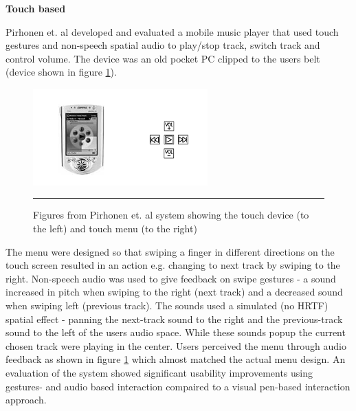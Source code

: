 \textbf{Touch based}

Pirhonen et. al \cite{pirhonen_gestural_2002} developed and evaluated a mobile music player that used touch gestures and non-speech spatial audio to play/stop track, switch track and control volume. The device was an old pocket PC clipped to the users belt (device shown in figure \ref{fig:pirhonen}).

\begin{figure}[t]
	\centering
		\includegraphics[width=0.6\textwidth,height=\textheight,keepaspectratio]{./Figures/pirhonen-system.png}
		\rule{35em}{0.5pt}
	\caption[Pirhonen system]{Figures from Pirhonen et. al \cite{pirhonen_gestural_2002} system showing the touch device (to the left) and touch menu (to the right)}
	\label{fig:pirhonen}
\end{figure}

The menu were designed so that swiping a finger in different directions on the touch screen resulted in an action e.g. changing to next track by swiping to the right. Non-speech audio was used to give feedback on swipe gestures - a sound increased in pitch when swiping to the right (next track) and a decreased sound when swiping left (previous track). The sounds used a simulated (no HRTF) spatial effect - panning the next-track sound to the right and the previous-track sound to the left of the users audio space. While these sounds popup the current chosen track were playing in the center. Users perceived the menu through audio feedback as shown in figure \ref{fig:pirhonen} which almost matched the actual menu design. An evaluation of the system showed significant usability improvements using gestures- and audio based interaction compaired to a visual pen-based interaction approach.

